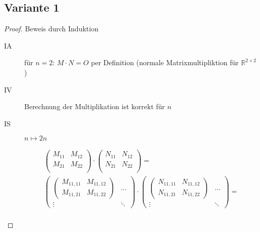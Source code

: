 \documentclass[a4paper]{article}
\begin{document}
    \subsection*{Variante 1}
    \label{subsec:variante1}
    \begin{proof}
        Beweis durch Induktion

        \begin{description}
            \item[IA] für $n = 2$: $M \cdot N = O$ per Definition (normale Matrixmultipliktion für $\mathbb{R}^{2 \times 2}$)
            \item[IV] Berechnung der Multiplikation ist korrekt für $n$
            \item[IS] $n \longmapsto 2n$

            \setlength{\jot}{10pt}
            \begin{gather*}
                \begin{pmatrix}
                    M_{11} & M_{12} \\
                    M_{21} & M_{22} \\
                \end{pmatrix} \cdot
                \begin{pmatrix}
                    N_{11} & N_{12} \\
                    N_{21} & N_{22} \\
                \end{pmatrix} = \\
                \begin{pmatrix}
                    \begin{pmatrix}
                        M_{11,11} & M_{11,12} \\
                        M_{11,21} & M_{11,22}
                    \end{pmatrix} & \dots \\
                    \vdots & \ddots
                \end{pmatrix} \cdot
                \begin{pmatrix}
                    \begin{pmatrix}
                        N_{11,11} & N_{11,12} \\
                        N_{11,21} & N_{11,22}
                    \end{pmatrix} & \dots \\
                    \vdots & \ddots
                \end{pmatrix} = \\

\end{gather*}
\end{description}
\end{proof}
\end{document}
